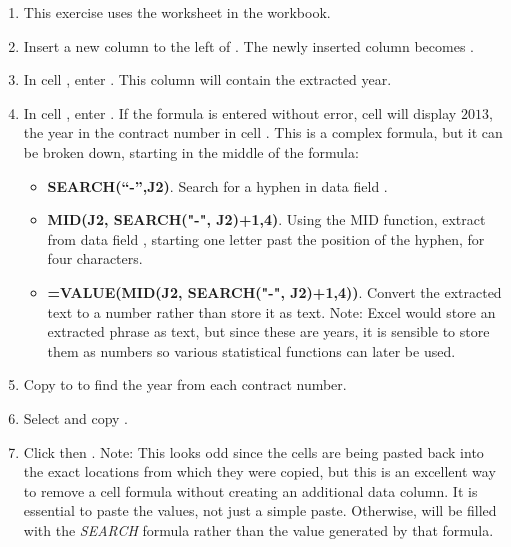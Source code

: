 \begin{enumbox}
	\begin{enumerate}
		\item This exercise uses the  worksheet in the  workbook.
		\item Insert a new column to the left of . The newly inserted column becomes .
		\item In cell , enter . This column will contain the extracted year.
		\item In cell , enter . If the formula is entered without error, cell  will display $ 2013 $, the year in the contract number in cell . This is a complex formula, but it can be broken down, starting in the middle of the formula: 
		
		\begin{itemize}
			\item \textbf{SEARCH(``-'',J2)}. Search for a hyphen in data field .

			\item \textbf{MID(J2, SEARCH("-", J2)+1,4)}. Using the MID function, extract from data field , starting one letter past the position of the hyphen, for four characters.

			\item \textbf{=VALUE(MID(J2, SEARCH("-", J2)+1,4))}. Convert the extracted text to a number rather than store it as text. Note: Excel would store an extracted phrase as text, but since these are years, it is sensible to store them as numbers so various statistical functions can later be used.
		\end{itemize}
	
		\item Copy  to  to find the year from each contract number.

		\item Select and copy .

		\item Click  then . Note: This looks odd since the cells are being pasted back into the exact locations from which they were copied, but this is an excellent way to remove a cell formula without creating an additional data column. It is essential to paste the values, not just a simple paste. Otherwise,  will be filled with the \textit{SEARCH} formula rather than the value generated by that formula.


\end{enumerate}
\end{enumbox}
